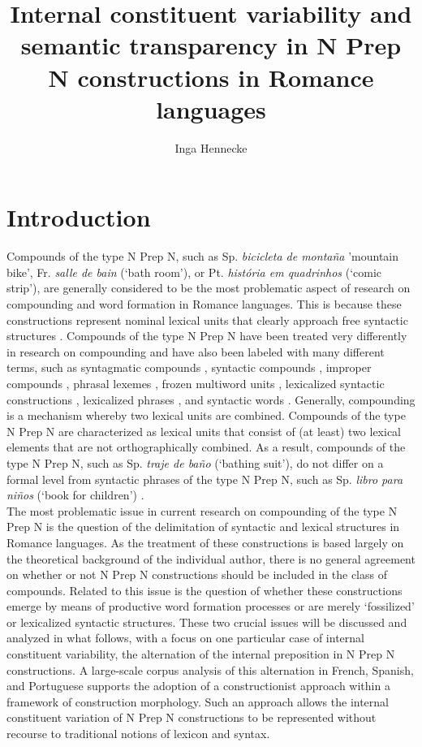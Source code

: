 \documentclass[output=paper]{langsci/langscibook}
\title{Internal constituent variability and semantic transparency in N Prep N constructions in Romance languages}
\author{%
  Inga Hennecke\affiliation{University of Tübingen}
}
\begin{document}
\maketitle
\section{Introduction} 
Compounds of the type N Prep N, such as Sp. \textit{bicicleta de montaña} 'mountain bike', Fr. \textit{salle de bain} (`bath room'), or Pt. \textit{história em quadrinhos} (`comic strip'), are generally considered to be the most problematic aspect of research on compounding and word formation in Romance languages. This is because these constructions represent nominal lexical units that clearly approach free syntactic structures \citep{BustosGisbert:1986}. Compounds of the type N Prep N have been treated very differently in research on compounding and have also been labeled with many different terms, such as syntagmatic compounds \citep{BuenafuentesdelaMata:2010}, syntactic compounds \citep{RioTorto:2009}, improper compounds \citep{Kornfeld:2009}, phrasal lexemes \citep{Masini:2007}, frozen multiword units \citep{Guevara:2012}, lexicalized syntactic constructions \citep{Villoing:2012}, lexicalized phrases \citep{Fradin:2009}, and syntactic words \citep{DiSciullo:1987}. Gen\citep{Guevara:2012}erally, compounding is a mechanism whereby two lexical units are combined. Compounds of the type N Prep N are characterized as lexical units that consist of (at least) two lexical elements that are not orthographically combined. As a result, compounds of the type N Prep N, such as Sp. \textit{traje de baño} (`bathing suit'), do not differ on a formal level from syntactic phrases of the type N Prep N, such as Sp. \textit{libro para niños} (`book for children') \citep[69]{BustosGisbert:1986}.  \\

The most problematic issue in current research on compounding of the type N Prep N is the question of the delimitation of syntactic and lexical structures in Romance languages. As the treatment of these constructions is based largely on the theoretical background of the individual author, there is no general agreement on whether or not N Prep N constructions should be included in the class of compounds. Related to this issue is the question of whether these constructions emerge by means of productive word formation processes or are merely `fossilized' or lexicalized syntactic structures. These two crucial issues will be discussed and analyzed in what follows, with a focus on one particular case of internal constituent variability, the alternation of the internal preposition in N Prep N constructions. A large-scale corpus analysis of this alternation in French, Spanish, and Portuguese supports the adoption of a constructionist approach within a framework of construction morphology. Such an approach allows the internal constituent variation of N Prep N constructions to be represented without recourse to traditional notions of lexicon and syntax.
\end{document}
